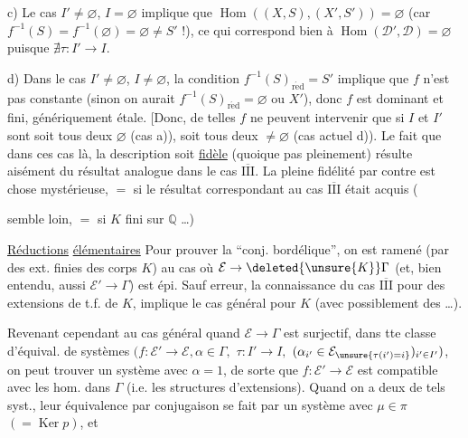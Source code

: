 
c) Le cas $I'\ne\varnothing$, $I=\varnothing$ implique que $\operatorname{Hom}((X,S),(X',S'))=\varnothing$ (car $f^{-1}(S)=f^{-1}(\varnothing)=\varnothing\ne S'$ !), ce qui correspond bien  à $\operatorname{Hom}(\mathcal D',\mathcal D)=\varnothing$ puisque $\nexists\tau:I'\to I$.

d) Dans le cas $I'\ne\varnothing$, $I\ne\varnothing$, la condition $f^{-1}(S)_{\mathrm{r\acute ed}}=S'$ implique que $f$ n'est pas constante (sinon on aurait $f^{-1}(S)_{\mathrm{r\acute ed}}=\varnothing$ ou $X'$), donc $f$ est dominant et fini, génériquement étale. [Donc, de telles $f$ ne  peuvent intervenir que si $I$ et $I'$ sont soit tous deux $\varnothing$ (cas a)), soit tous deux $\ne\varnothing$ (cas actuel d)). Le fait que dans ces cas là, la description  soit \uline{fidèle} (quoique pas pleinement) résulte aisément du résultat analogue dans le cas \uline{$\overline{\mathrm{III}}$}.
La pleine fidélité par contre est chose mystérieuse, $=$ si le résultat correspondant   au cas \uline{$\overline{\mathrm{III}}$} était acquis (


semble loin, $=$ si $K$ fini sur $\mathbb Q$ \ldots)

\uline{Réductions} \uline{élémentaires} Pour prouver la ``conj. bordélique'', on est ramené (par des ext. finies des corps $K$) au cas où $\mathcal E\to\deleted{\unsure{K}}\Gamma$ (et, bien entendu, aussi $\mathcal E'\to\Gamma$) est épi. Sauf erreur, la connaissance du cas \uline{$\overline{\mathrm{III}}$} pour des extensions de t.f. de $K$, implique le cas général pour $K$ (avec possiblement des  \ldots).

Revenant cependant au cas général quand $\mathcal E\to\Gamma$ est surjectif, dans tte classe d'équival. de systèmes $(f:\mathcal E'\to\mathcal E,\alpha\in\Gamma,$  $\tau:I'\to I,$  $(\alpha_{i'}\in\mathcal E_{\unsure{\tau(i')=i}})_{i'\in I'})$, on peut trouver un système avec $\alpha=1$, de sorte que $f:\mathcal E'\to\mathcal E$ est compatible avec les hom. dans $\Gamma$ (i.e. les structures d'extensions).
Quand on a deux de tels syst., leur équivalence par conjugaison se fait par un système  avec \uline{$\mu\in\pi$} $(=\operatorname{Ker}p)$, et


